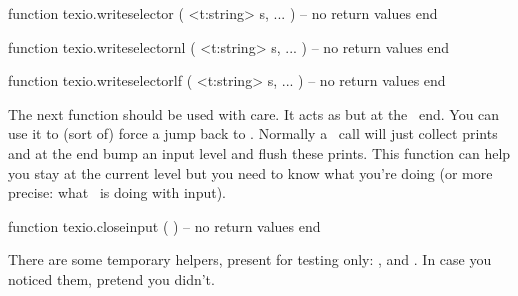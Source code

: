 \starttyping[option=LUA]
function texio.writeselector ( <t:string> s, ... )
    -- no return values
end

function texio.writeselectornl ( <t:string> s, ... )
    -- no return values
end

function texio.writeselectorlf ( <t:string> s, ... )
    -- no return values
end
\stoptyping

The next function should be used with care. It acts as \type {\endinput} but at
the \LUA\ end. You can use it to (sort of) force a jump back to \TEX. Normally a
\LUA\ call will just collect prints and at the end bump an input level and flush
these prints. This function can help you stay at the current level but you need
to know what you're doing (or more precise: what \TEX\ is doing with input).

\starttyping[option=LUA]
function texio.closeinput ( )
    -- no return values
end
\stoptyping

There are some temporary helpers, present for testing only: ,
 and . In case you noticed them,
pretend you didn't.

\stopsection

\stopdocument

